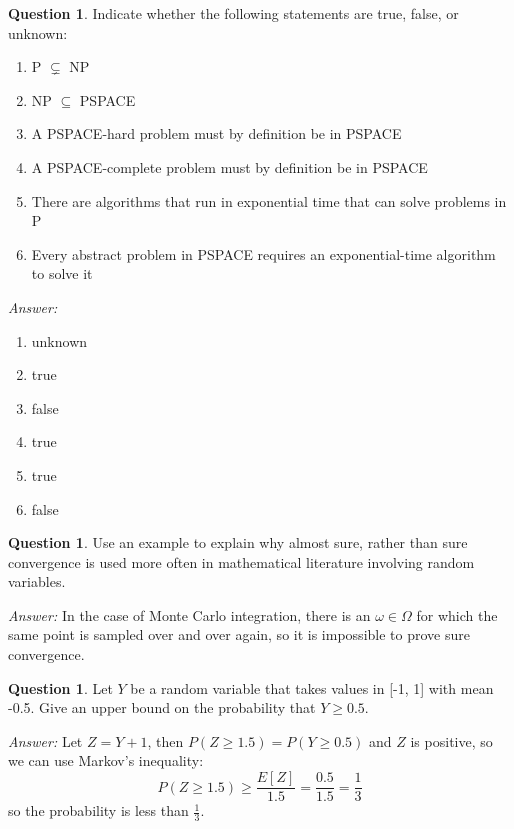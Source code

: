 \documentclass{article}
\theoremstyle{definition}
\newtheorem{question}[thm]{Question}
\newenvironment{answer}{\noindent\textit{Answer:}}{}
\begin{document}
\begin{question}
    Indicate whether the following statements are true, false, or unknown:
    \begin{enumerate}[label=\alph*)]
        \item P $\subsetneq$ NP
        \item NP $\subseteq$ PSPACE
        \item A PSPACE-hard problem must by definition be in PSPACE
        \item A PSPACE-complete problem must by definition be in PSPACE
        \item There are algorithms that run in exponential time that can solve problems in P
        \item Every abstract problem in PSPACE requires an exponential-time algorithm to solve it
    \end{enumerate}
\end{question}

\begin{answer} 
     \begin{enumerate}[label=\alph*)]
        \item unknown
        \item true
        \item false
        \item true
        \item true
        \item false
    \end{enumerate}
\end{answer}

\begin{question}
    Use an example to explain why almost sure, rather than sure convergence is used more often in mathematical literature involving random variables.
\end{question}

\begin{answer}
    In the case of Monte Carlo integration, there is an $\omega \in \Omega$ for which the same point is sampled over and over again, so it is impossible to prove sure convergence.
\end{answer}

\begin{question}
    Let $Y$ be a random variable that takes values in [-1, 1] with mean -0.5. Give an upper bound on the probability that $Y \geq 0.5$.
\end{question}

\begin{answer}
    Let $Z=Y+1$, then $P(Z \geq 1.5) = P(Y \geq 0.5)$ and $Z$ is positive, so we can use Markov's inequality:
    $$P(Z \geq 1.5) \geq \frac{E[Z]}{1.5} = \frac{0.5}{1.5} = \frac{1}{3}$$
    so the probability is less than $\frac{1}{3}$.
\end{answer}
\end{document}
